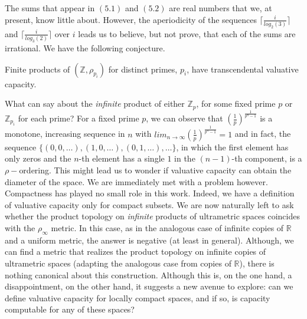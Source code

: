 
The sums that appear in $(5.1)$ and $(5.2)$ are real numbers that we, at present, know  little about. However, the aperiodicity of the sequences $\lceil\frac{i}{log_2(3)}\rceil$ and $\lceil\frac{i}{log_3(2)}\rceil$ over $i$ leads us to believe, but not prove, that each of the sums are irrational. We have the following conjecture.\\

\begin{conjecture} Finite products of $(\mathbb{Z}, \rho_{p_i})$ for distinct primes, $p_i$, have transcendental valuative capacity.\\ \end{conjecture}
 
What can say about the \textit{infinite} product of either $\mathbb{Z}_{p}$, for some fixed prime $p$ or $\mathbb{Z}_{p_i}$ for each prime? For a fixed prime $p$,  we can observe that $(\frac{1}{p})^{\frac{1}{p^n-1}}$ is a monotone, increasing sequence in $n$ with $ lim_{n\to\infty} (\frac{1}{p})^{\frac{1}{p^n-1}} =  1$ and in fact, the sequence $\{(0,0,\ldots), (1,0,\ldots), (0,1,\ldots), \ldots\}$, in which the first element has only zeros and the $n$-th element has a single $1$ in the $(n-1)$-th component, is a $\rho-$ordering. This might lead us to wonder if valuative capacity can obtain the diameter of the space. We are immediately met with a problem however.\\

Compactness has played no small role in this work. Indeed, we have a definition of valuative capacity only for compact subsets. 
We are now naturally left to ask whether the product topology on \textit{infinite} products of ultrametric spaces coincides with the $\rho_\infty$ metric. In this case, as in the analogous case of infinite copies of $\mathbb{R}$ and a uniform metric, the answer is negative (at least in general). Although, we can find a metric that realizes the product topology on infinite copies of ultrametric spaces (adapting the analogous case from copies of $\mathbb{R}$), there is nothing canonical about this construction. Although this is, on the one hand, a disappointment, on the other hand, it suggests a new avenue to explore: can we define valuative capacity for locally compact spaces, and if so, is capacity computable for any of these spaces?

